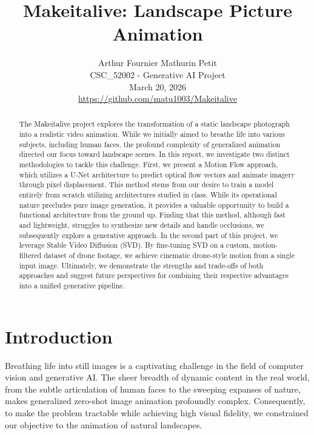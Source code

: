\documentclass[10pt,twocolumn,letterpaper]{article}
\title{Makeitalive: Landscape Picture Animation}
\author{
Arthur Fournier \quad Mathurin Petit \\[4pt]
\normalsize CSC\_52002 - Generative AI Project \\
\normalsize March 20, 2026 \\[4pt]
\url{https://github.com/matu1003/Makeitalive}
}
\begin{document}
\maketitle

\begin{abstract}
The Makeitalive project explores the transformation of a static landscape photograph into a realistic video animation. While we initially aimed to breathe life into various subjects, including human faces, the profound complexity of generalized animation directed our focus toward landscape scenes. In this report, we investigate two distinct methodologies to tackle this challenge. First, we present a Motion Flow approach, which utilizes a U-Net architecture to predict optical flow vectors and animate imagery through pixel displacement. This method stems from our desire to train a model entirely from scratch utilizing architectures studied in class. While its operational nature precludes pure image generation, it provides a valuable opportunity to build a functional architecture from the ground up. Finding that this method, although fast and lightweight, struggles to synthesize new details and handle occlusions, we subsequently explore a generative approach. In the second part of this project, we leverage Stable Video Diffusion (SVD). By fine-tuning SVD on a custom, motion-filtered dataset of drone footage, we achieve cinematic drone-style motion from a single input image. Ultimately, we demonstrate the strengths and trade-offs of both approaches and suggest future perspectives for combining their respective advantages into a unified generative pipeline.
\end{abstract}

\section{Introduction}

Breathing life into still images is a captivating challenge in the field of computer vision and generative AI. The sheer breadth of dynamic content in the real world, from the subtle articulation of human faces to the sweeping expanses of nature, makes generalized zero-shot image animation profoundly complex. Consequently, to make the problem tractable while achieving high visual fidelity, we constrained our objective to the animation of natural landscapes.
\end{document}

